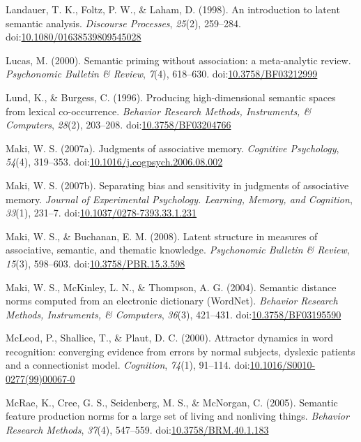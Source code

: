 \documentclass[english,man]{apa6}
\theoremstyle{definition}
\theoremstyle{definition}
\theoremstyle{definition}
\theoremstyle{remark}
\begin{document}
\hypertarget{ref-Landauer1998}{}
Landauer, T. K., Foltz, P. W., \& Laham, D. (1998). An introduction to
latent semantic analysis. \emph{Discourse Processes}, \emph{25}(2),
259--284.
doi:\href{https://doi.org/10.1080/01638539809545028}{10.1080/01638539809545028}

\hypertarget{ref-Lucas2000}{}
Lucas, M. (2000). Semantic priming without association: a meta-analytic
review. \emph{Psychonomic Bulletin \& Review}, \emph{7}(4), 618--630.
doi:\href{https://doi.org/10.3758/BF03212999}{10.3758/BF03212999}

\hypertarget{ref-Lund1996}{}
Lund, K., \& Burgess, C. (1996). Producing high-dimensional semantic
spaces from lexical co-occurrence. \emph{Behavior Research Methods,
Instruments, \& Computers}, \emph{28}(2), 203--208.
doi:\href{https://doi.org/10.3758/BF03204766}{10.3758/BF03204766}

\hypertarget{ref-Maki2007a}{}
Maki, W. S. (2007a). Judgments of associative memory. \emph{Cognitive
Psychology}, \emph{54}(4), 319--353.
doi:\href{https://doi.org/10.1016/j.cogpsych.2006.08.002}{10.1016/j.cogpsych.2006.08.002}

\hypertarget{ref-Maki2007}{}
Maki, W. S. (2007b). Separating bias and sensitivity in judgments of
associative memory. \emph{Journal of Experimental Psychology. Learning,
Memory, and Cognition}, \emph{33}(1), 231--7.
doi:\href{https://doi.org/10.1037/0278-7393.33.1.231}{10.1037/0278-7393.33.1.231}

\hypertarget{ref-Maki2008}{}
Maki, W. S., \& Buchanan, E. M. (2008). Latent structure in measures of
associative, semantic, and thematic knowledge. \emph{Psychonomic
Bulletin \& Review}, \emph{15}(3), 598--603.
doi:\href{https://doi.org/10.3758/PBR.15.3.598}{10.3758/PBR.15.3.598}

\hypertarget{ref-Maki2004}{}
Maki, W. S., McKinley, L. N., \& Thompson, A. G. (2004). Semantic
distance norms computed from an electronic dictionary (WordNet).
\emph{Behavior Research Methods, Instruments, \& Computers},
\emph{36}(3), 421--431.
doi:\href{https://doi.org/10.3758/BF03195590}{10.3758/BF03195590}

\hypertarget{ref-McLeod2000}{}
McLeod, P., Shallice, T., \& Plaut, D. C. (2000). Attractor dynamics in
word recognition: converging evidence from errors by normal subjects,
dyslexic patients and a connectionist model. \emph{Cognition},
\emph{74}(1), 91--114.
doi:\href{https://doi.org/10.1016/S0010-0277(99)00067-0}{10.1016/S0010-0277(99)00067-0}

\hypertarget{ref-McRae2005}{}
McRae, K., Cree, G. S., Seidenberg, M. S., \& McNorgan, C. (2005).
Semantic feature production norms for a large set of living and
nonliving things. \emph{Behavior Research Methods}, \emph{37}(4),
547--559.
doi:\href{https://doi.org/10.3758/BRM.40.1.183}{10.3758/BRM.40.1.183}
\end{document}
